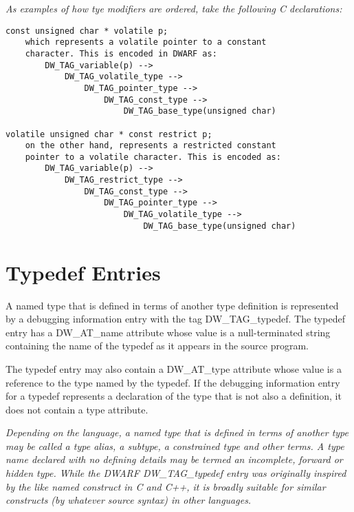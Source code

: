 \clearpage
\textit{As examples of how tye modifiers are ordered, take the following C
declarations:}

\begin{verbatim}
const unsigned char * volatile p;
    which represents a volatile pointer to a constant
    character. This is encoded in DWARF as:
        DW_TAG_variable(p) -->
            DW_TAG_volatile_type -->
                DW_TAG_pointer_type -->
                    DW_TAG_const_type -->
                        DW_TAG_base_type(unsigned char)

volatile unsigned char * const restrict p;
    on the other hand, represents a restricted constant
    pointer to a volatile character. This is encoded as:
        DW_TAG_variable(p) -->
            DW_TAG_restrict_type -->
                DW_TAG_const_type -->
                    DW_TAG_pointer_type -->
                        DW_TAG_volatile_type -->
                            DW_TAG_base_type(unsigned char)

\end{verbatim}

\section{Typedef Entries}
\label{chap:typedefentries}
A named type that is defined in terms of another type
definition is represented by a debugging information entry with
the tag DW\_TAG\_typedef. The typedef entry has a DW\_AT\_name
attribute whose value is a null-terminated string containing
the name of the typedef as it appears in the source program.

The typedef entry may also contain a DW\_AT\_type attribute whose
value is a reference to the type named by the typedef. If
the debugging information entry for a typedef represents
a declaration of the type that is not also a definition,
it does not contain a type attribute.

\textit{Depending on the language, a named type that is defined in
terms of another type may be called a type alias, a subtype,
a constrained type and other terms. A type name declared with
no defining details may be termed an incomplete, forward
or hidden type. While the DWARF DW\_TAG\_typedef entry was
originally inspired by the like named construct in C and C++,
it is broadly suitable for similar constructs (by whatever
source syntax) in other languages.}

